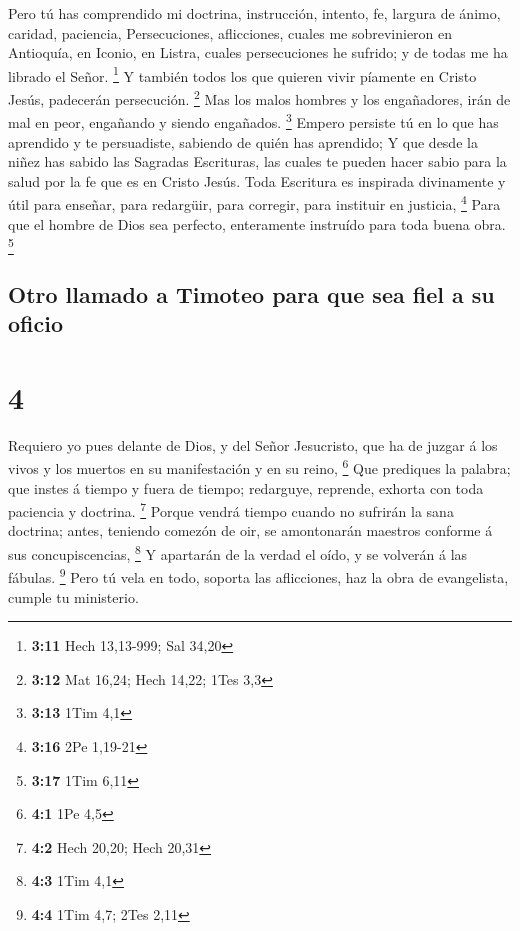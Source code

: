  Pero tú has comprendido mi doctrina, instrucción,
intento, fe, largura de ánimo, caridad, paciencia, 
Persecuciones, aflicciones, cuales me sobrevinieron en Antioquía, en
Iconio, en Listra, cuales persecuciones he sufrido; y de todas me ha
librado el Señor. \footnote{\textbf{3:11} Hech 13,13-999; Sal 34,20}
 Y también todos los que quieren vivir píamente en Cristo
Jesús, padecerán persecución. \footnote{\textbf{3:12} Mat 16,24; Hech
  14,22; 1Tes 3,3}  Mas los malos hombres y los
engañadores, irán de mal en peor, engañando y siendo engañados.
\footnote{\textbf{3:13} 1Tim 4,1}  Empero persiste tú en
lo que has aprendido y te persuadiste, sabiendo de quién has aprendido;
 Y que desde la niñez has sabido las Sagradas Escrituras,
las cuales te pueden hacer sabio para la salud por la fe que es en
Cristo Jesús.  Toda Escritura es inspirada divinamente y
útil para enseñar, para redargüir, para corregir, para instituir en
justicia, \footnote{\textbf{3:16} 2Pe 1,19-21}  Para que
el hombre de Dios sea perfecto, enteramente instruído para toda buena
obra. \footnote{\textbf{3:17} 1Tim 6,11}

\hypertarget{otro-llamado-a-timoteo-para-que-sea-fiel-a-su-oficio}{%
\subsection{Otro llamado a Timoteo para que sea fiel a su
oficio}\label{otro-llamado-a-timoteo-para-que-sea-fiel-a-su-oficio}}

\hypertarget{section-3}{%
\section{4}\label{section-3}}

 Requiero yo pues delante de Dios, y del Señor Jesucristo,
que ha de juzgar á los vivos y los muertos en su manifestación y en su
reino, \footnote{\textbf{4:1} 1Pe 4,5}  Que prediques la
palabra; que instes á tiempo y fuera de tiempo; redarguye, reprende,
exhorta con toda paciencia y doctrina. \footnote{\textbf{4:2} Hech
  20,20; Hech 20,31}  Porque vendrá tiempo cuando no
sufrirán la sana doctrina; antes, teniendo comezón de oir, se
amontonarán maestros conforme á sus concupiscencias, \footnote{\textbf{4:3}
  1Tim 4,1}  Y apartarán de la verdad el oído, y se
volverán á las fábulas. \footnote{\textbf{4:4} 1Tim 4,7; 2Tes 2,11}
 Pero tú vela en todo, soporta las aflicciones, haz la
obra de evangelista, cumple tu ministerio.

